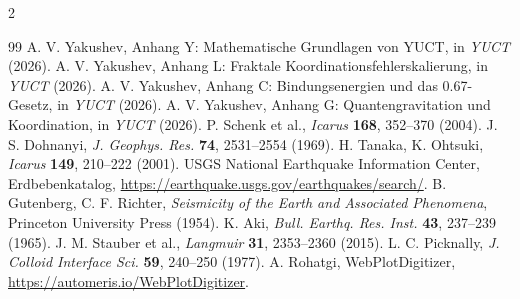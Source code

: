 \documentclass[11pt,a4paper]{article}
\begin{document}
\begin{multicols}{2}
		\begin{thebibliography}{99}
			 A. V. Yakushev, Anhang Y: Mathematische Grundlagen von YUCT, in \emph{YUCT} (2026).
			 A. V. Yakushev, Anhang L: Fraktale Koordinationsfehlerskalierung, in \emph{YUCT} (2026).
			 A. V. Yakushev, Anhang C: Bindungsenergien und das 0.67-Gesetz, in \emph{YUCT} (2026).
			 A. V. Yakushev, Anhang G: Quantengravitation und Koordination, in \emph{YUCT} (2026).
			 P. Schenk et al., \emph{Icarus} \textbf{168}, 352–370 (2004).
			 J. S. Dohnanyi, \emph{J. Geophys. Res.} \textbf{74}, 2531–2554 (1969).
			 H. Tanaka, K. Ohtsuki, \emph{Icarus} \textbf{149}, 210–222 (2001).
			 USGS National Earthquake Information Center, Erdbebenkatalog, \url{https://earthquake.usgs.gov/earthquakes/search/}.
			 B. Gutenberg, C. F. Richter, \emph{Seismicity of the Earth and Associated Phenomena}, Princeton University Press (1954).
			 K. Aki, \emph{Bull. Earthq. Res. Inst.} \textbf{43}, 237–239 (1965).
			 J. M. Stauber et al., \emph{Langmuir} \textbf{31}, 2353–2360 (2015).
			 L. C. Picknally, \emph{J. Colloid Interface Sci.} \textbf{59}, 240–250 (1977).
			 A. Rohatgi, WebPlotDigitizer, \url{https://automeris.io/WebPlotDigitizer}.
		\end{thebibliography}
		
	\end{multicols}
\end{document}
